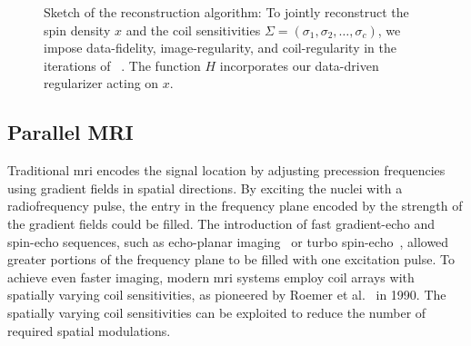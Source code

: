 \begin{figure}
%
	\caption[Sketch of the joint nonlinear inversion algorithm for parallel MRI]{%
		Sketch of the reconstruction algorithm:
		To jointly reconstruct the spin density \( x \) and the coil sensitivities \( \Sigma = (\sigma_{\num{1}},\sigma_{\num{2}},\dotsc,\sigma_c) \), we impose data-fidelity, image-regularity, and coil-regularity in the iterations of ~\cite{pock_inertial_2016}.
		The function \( H \) incorporates our data-driven regularizer acting on \( x \).
	}
	\label{fig:reco}
\end{figure}

\subsection{Parallel MRI}
\label{ssec:parallel imaging intro}
Traditional \gls{mri} encodes the signal location by adjusting precession frequencies using gradient fields in spatial directions.
By exciting the nuclei with a radiofrequency pulse, the entry in the frequency plane encoded by the strength of the gradient fields could be filled.
The introduction of fast gradient-echo and spin-echo sequences, such as echo-planar imaging~\cite{Mansfield1977} or turbo spin-echo~\cite{Hennig1986}, allowed greater portions of the frequency plane to be filled with one excitation pulse.
To achieve even faster imaging, modern \gls{mri} systems employ coil arrays with spatially varying coil sensitivities, as pioneered by Roemer et al.~\cite{Roemer1990} in \num{1990}.
The spatially varying coil sensitivities can be exploited to reduce the number of required spatial modulations.

